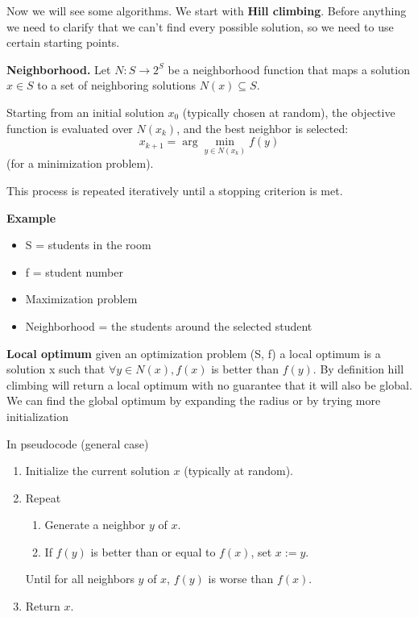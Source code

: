 \vspace{10pt}

Now we will see some algorithms. We start with \textbf{Hill climbing}. Before anything we need to clarify that we can't find every possible solution, so we need to use certain starting points.

\vspace{10pt}

\textbf{Neighborhood.}
Let $N : S \to 2^S$ be a neighborhood function that maps a solution 
$x \in S$ to a set of neighboring solutions $N(x) \subseteq S$.

Starting from an initial solution $x_0$ (typically chosen at random), 
the objective function is evaluated over $N(x_k)$, and the best 
neighbor is selected:
\[
x_{k+1} = \arg\min_{y \in N(x_k)} f(y)
\]
(for a minimization problem).

This process is repeated iteratively until a stopping criterion is met.

\vspace{10pt}

\textbf{Example}

\vspace{10pt}

\begin{itemize}
    \item S = {students in the room}
    \item f = student number 
    \item Maximization problem
    \item Neighborhood = the students around the selected student
\end{itemize}

\textbf{Local optimum} \ra given an optimization problem (S, f) a local optimum is a solution x such that $\forall y \in N(x), f(x)$ is better than $f(y)$. By definition hill climbing will return a local optimum with no guarantee that it will also be global. We can find the global optimum by expanding the radius or by trying more initialization

\vspace{10pt}

In pseudocode (general case)

\begin{enumerate}
    \item Initialize the current solution $x$ (typically at random).
    \item Repeat
    \begin{enumerate}[label=\theenumi.\arabic*]
        \item Generate a neighbor $y$ of $x$.
        \item If $f(y)$ is better than or equal to $f(x)$, set $x := y$.
    \end{enumerate}
    Until for all neighbors $y$ of $x$, $f(y)$ is worse than $f(x)$.
    \item Return $x$.
\end{enumerate}

